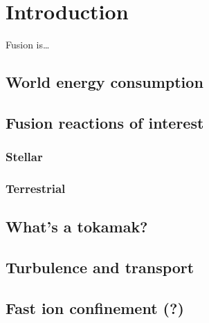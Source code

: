 \chapter{Introduction}

Fusion is\ldots

\section{World energy consumption}

\section{Fusion reactions of interest}
\subsection{Stellar}
\subsection{Terrestrial}

\section{What's a tokamak?}

\section{Turbulence and transport}

\section{Fast ion confinement (?)}
